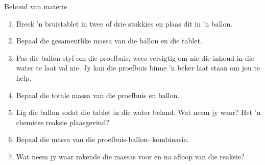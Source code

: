 \begin{i_experiment}{Behoud van materie}
\begin{minipage}{.6\textwidth}
\begin{enumerate}[noitemsep, label=\textbf{\arabic*}. ]
\item Breek 'n bruistablet in twee of drie stukkies en plaas dit in 'n ballon.
\item Bepaal die gesamentlike massa van die ballon en die tablet.
\item Pas die ballon styf om die proefbuis; wees versigtig om nie die inhoud in die water te laat val nie. Jy kan die proefbuis binne  'n beker laat staan om jou te help.
\item Bepaal die totale massa van die proefbuis en ballon.
\item Lig die ballon sodat die tablet in die water beland. Wat neem jy waar? Het 'n chemiese reaksie plaasgevind?
\item Bepaal die massa van die proefbuis-ballon- kombinasie.
\item Wat neem jy waar rakende die massas voor en na afloop van die reaksie?
\end{enumerate}
\end{minipage}
\begin{minipage}{.4\textwidth}
 \begin{center}
\end{center}
\end{minipage}
\end{i_experiment}
